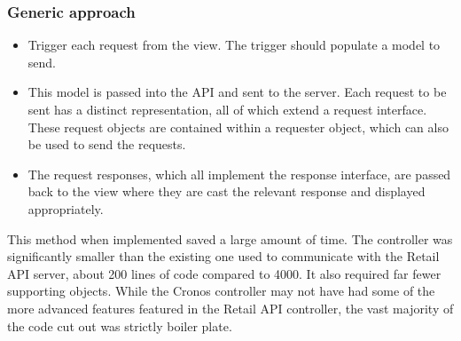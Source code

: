 \documentclass[a4paper, 11pt, titlepage]{article}
\begin{document}
\subsubsection{Generic approach} 
\begin{itemize} 
\item Trigger each request from the view. The trigger should populate a model to send. \label{cronos_generic_api} 
\item This model is passed into the API and sent to the server. Each request to be sent has a distinct representation, all of which extend a request interface. These request objects are contained within a requester object, which can also be used to send the requests. 
\item The request responses, which all implement the response interface, are passed back to the view where they are cast the relevant response and displayed appropriately. 
\end{itemize} 
This method when implemented saved a large amount of time. The controller was significantly smaller than the existing one used to communicate with the Retail API server, about 200 lines of code compared to 4000. It also required far fewer supporting objects. While the Cronos controller may not have had some of the more advanced features featured in the Retail API controller, the vast majority of the code cut out was strictly boiler plate. 
\end{document}
